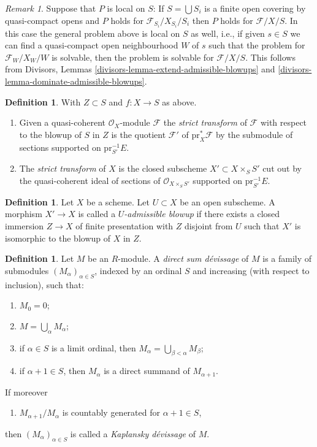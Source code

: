 \documentclass{amsart}
\theoremstyle{plain}
\theoremstyle{definition}
\newtheorem{definition}[subsection]{Definition}
\theoremstyle{remark}
\newtheorem{remark}[subsection]{Remark}
\numberwithin{equation}{subsection}
\begin{document}
\begin{remark}
\medskip\noindent
Suppose that $P$ is local on $S$: If $S = \bigcup S_i$ is a finite open
covering by quasi-compact opens and $P$ holds for
$\mathcal{F}_{S_i}/X_{S_i}/S_i$ then $P$ holds for $\mathcal{F}/X/S$.
In this case the general problem above is local on $S$ as well, i.e.,
if given $s \in S$ we can find a quasi-compact open neighbourhood $W$ of $s$
such that the problem for $\mathcal{F}_W/X_W/W$ is solvable, then the
problem is solvable for $\mathcal{F}/X/S$. This follows from
Divisors, Lemmas \ref{divisors-lemma-extend-admissible-blowups} and
\ref{divisors-lemma-dominate-admissible-blowups}.
\end{remark}

\begin{definition}
\label{divisors-definition-strict-transform}
With $Z \subset S$ and $f : X \to S$ as above.
\begin{enumerate}
\item Given a quasi-coherent $\mathcal{O}_X$-module $\mathcal{F}$
the {\it strict transform} of $\mathcal{F}$ with respect to the blowup
of $S$ in $Z$ is the quotient $\mathcal{F}'$ of $\text{pr}_X^*\mathcal{F}$
by the submodule of sections supported on $\text{pr}_{S'}^{-1}E$.
\item The {\it strict transform} of $X$ is the closed subscheme
$X' \subset X \times_S S'$ cut out by the quasi-coherent ideal of
sections of $\mathcal{O}_{X \times_S S'}$ supported on $\text{pr}_{S'}^{-1}E$.
\end{enumerate}
\end{definition}

\begin{definition}
\label{divisors-definition-admissible-blowup}
Let $X$ be a scheme. Let $U \subset X$ be an open subscheme. A morphism
$X' \to X$ is called a {\it $U$-admissible blowup} if there exists a
closed immersion $Z \to X$ of finite presentation with $Z$ disjoint from
$U$ such that $X'$ is isomorphic to the blowup of $X$ in $Z$.
\end{definition}

\begin{definition}
\label{algebra-definition-devissage}
Let $M$ be an $R$-module.  A {\it direct sum d\'evissage} of $M$ is a family
of submodules $(M_{\alpha})_{\alpha \in S}$, indexed by an ordinal $S$ and
increasing (with respect to inclusion), such that:
\begin{enumerate}
\item[(0)] $M_0 = 0$;
\item[(1)] $M = \bigcup_{\alpha} M_{\alpha}$;
\item[(2)] if $\alpha \in S$ is a limit ordinal, then $M_{\alpha} =
\bigcup_{\beta < \alpha} M_{\beta}$;
\item[(3)] if $\alpha + 1 \in S$, then $M_{\alpha}$ is a direct summand of
$M_{\alpha + 1}$.
\end{enumerate}
If moreover
\begin{enumerate}
\item[(4)] $M_{\alpha + 1}/M_{\alpha}$ is countably generated for
$\alpha + 1 \in S$,
\end{enumerate}
then $(M_{\alpha})_{\alpha \in S}$ is called a {\it Kaplansky d\'evissage}
of $M$.
\end{definition}
\end{document}
